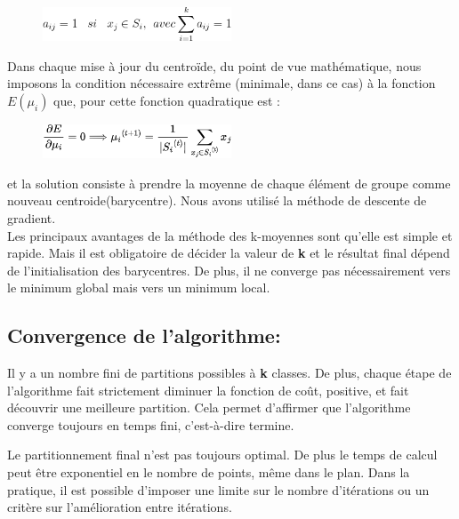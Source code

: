 \documentclass[a4paper,12pt]{report}
\begin{document}
\begin{figure}[h]
    \includegraphics[width=0.5\textwidth]{CodeCogsEqn (1).png}
    \label{aij}
\end{figure}



Dans chaque mise à jour du centroïde, du point de vue mathématique, nous imposons la condition nécessaire extrême (minimale, dans ce cas) à la fonction $E(\mu_i)$ que, pour cette fonction quadratique  est :\\

\begin{figure}[h]
    \centering
    \includegraphics[width=0.5\textwidth]{second equation.png}
    \label{fig:secondEquation}
\end{figure}



et la solution consiste à prendre la moyenne de chaque élément de groupe comme nouveau centroide(barycentre). Nous avons utilisé la méthode de descente de gradient.\\

Les principaux avantages de la méthode des k-moyennes sont qu'elle est simple et rapide. Mais il est obligatoire de décider la valeur de \textbf{k} et le résultat final dépend de l'initialisation des barycentres. De plus, il ne converge pas nécessairement vers le minimum global mais vers un minimum local.


\subsection{Convergence de l'algorithme:}
Il y a un nombre fini de partitions possibles à \textbf{k} classes. De plus, chaque étape de l'algorithme fait strictement diminuer la fonction de coût, positive, et fait découvrir une meilleure partition. Cela permet d'affirmer que l'algorithme converge toujours en temps fini, c'est-à-dire termine.

Le partitionnement final n'est pas toujours optimal. De plus le temps de calcul peut être exponentiel en le nombre de points, même dans le plan. Dans la pratique, il est possible d'imposer une limite sur le nombre d’itérations ou un critère sur l'amélioration entre itérations.\\
\end{document}
